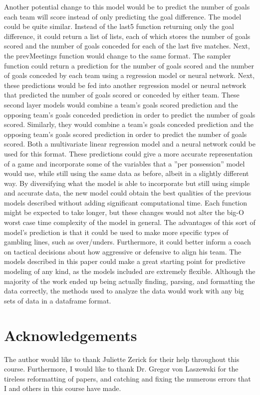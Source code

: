 \documentclass[sigconf]{acmart}
\begin{document}
Another potential change to this model would be to predict the number of goals each team will score instead of only predicting the goal difference. The model could be quite similar. Instead of the last5 function returning only the goal difference, it could return a list of lists, each of which stores the number of goals scored and the number of goals conceded for each of the last five matches. Next, the prevMeetings function would change to the same format. The sampler function could return a prediction for the number of goals scored and the number of goals conceded by each team using a regression model or neural network. Next, these predictions would be fed into another regression model or neural network that predicted the number of goals scored or conceded by either team. These second layer models would combine a team's goals scored prediction and the opposing team's goals conceded prediction in order to predict the number of goals scored. Similarly, they would combine a team's goals conceded prediction and the opposing team's goals scored prediction in order to predict the number of goals scored. Both a multivariate linear regression model and a neural network could be used for this format. These predictions could give a more accurate representation of a game and incorporate some of the variables that a ''per possession'' model would use, while still using the same data as before, albeit in a slightly different way. By diversifying what the model is able to incorporate but still using simple and accurate data, the new model could obtain the best qualities of the previous models described without adding significant computational time. Each function might be expected to take longer, but these changes would not alter the big-O worst case time complexity of the model in general. The advantages of this sort of model's prediction is that it could be used to make more specific types of gambling lines, such as over/unders. Furthermore, it could better inform a coach on tactical decisions about how aggressive or defensive to align his team.
The models described in this paper could make a great starting point for predictive modeling of any kind, as the models included are extremely flexible. Although the majority of the work ended up being actually finding, parsing, and formatting the data correctly, the methods used to analyze the data would work with any big sets of data in a dataframe format.

\section{Acknowledgements}
The author would like to thank Juliette Zerick for their help throughout this course. Furthermore, I would like to thank Dr. Gregor von Laszewski for the tireless reformatting of papers, and catching and fixing the numerous errors that I and others in this course have made. 



\end{document}
